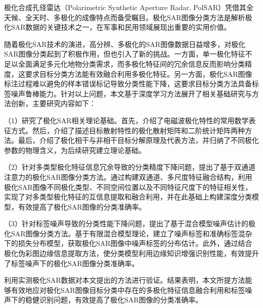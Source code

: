 \begin{chineseabstract}

    极化合成孔径雷达（Polarimetric Synthetic Aperture Radar, PolSAR）凭借其全天候、全天时、多极化的成像特点而备受瞩目。极化SAR图像分类方法是解析极化SAR数据的关键技术之一，在军事和民用领域展现出重要的实用价值。

    随着极化SAR技术的演进，高分辨、多极化的SAR图像数据日益增多，对极化SAR图像分类起到了积极作用，但也引入了新的挑战。一方面，单一极化特征不足以全面满足多元化地物分类需求，而多极化特征间的冗余信息反而影响分类精度，这要求目标分类方法能有效融合利用多极化特征。另一方面，极化SAR图像标注过程难以避免的样本错误标记导致分类性能下降，这要求目标分类方法具备标签噪声鲁棒能力。针对以上问题，本文基于深度学习方法展开了相关基础研究与方法创新，主要研究内容如下：

    （1）研究了极化SAR相关理论基础。首先，介绍了电磁波极化特性的常用数学表征方式。然后，介绍了描述目标散射特性的极化散射矩阵和二阶统计矩阵两种方法。最后，介绍了极化相干与非相干目标分解原理及代表方法，并归纳了不同极化参数的物理含义，为后续研究建立理论基础。

    （2）针对多类型极化特征信息冗余导致的分类精度下降问题，提出了基于双通道注意力的极化SAR图像分类方法。通过构建双通道、多尺度特征融合结构，利用极化SAR图像不同极化类型、不同空间位置以及不同特征尺度下的特征相关性，实现了对多类型极化特征的互信息提取和融合利用，并在此基础上构建深度分类模型，有效提高了极化SAR图像的分类准确率。

    （3）针对标签噪声导致的分类性能下降问题，提出了基于混合模型噪声估计的极化SAR图像分类方法。基于有限混合模型理论，建立了噪声标签和准确标签混杂下的损失分布模型，获取极化SAR图像中噪声标签的分布估计。此外，通过结合极化伪彩图边缘信息提取方法，使分类模型利用边缘知识增强识别性能，有效提升了标签噪声下的极化SAR图像分类准确率。

    利用实测极化SAR数据对本文提出的方法进行验证。结果表明，本文所提方法能够有效地应对极化SAR图像目标分类中存在的多极化特征信息融合利用和标签噪声下的稳健识别问题，有效提高了极化SAR图像的分类准确率。


\end{chineseabstract}
